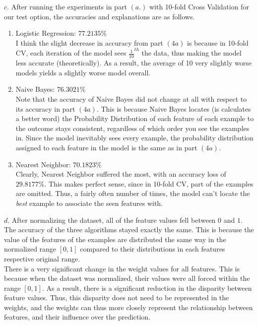 \documentclass[11pt]{article}
\begin{document}
\noindent $c.$ After running the experiments in part $(a.)$ with 10-fold Cross Validation for our test option, the accuracies and explanations are as follows.
\begin{enumerate}
\item Logistic Regression: $77.2135\%$\\
I think the slight decrease in accuracy from part $(4a)$ is because in 10-fold CV, each iteration of the model sees $\frac{1}{10}^{th}$ the data, thus making the model less accurate (theoretically). As a result, the average of 10 very slightly worse models yields a slightly worse model overall. 
\item Naive Bayes: $76.3021\%$\\
Note that the accuracy of Naive Bayes did not change at all with respect to its accuracy in part $(4a)$. This is because Naive Bayes locates (is calculates a better word) the Probability Distribution of each feature of each example to the outcome stays consistent, regardless of which order you see the examples in. Since the model inevitably sees every example, the probability distribution assigned to each feature in the model is the same as in part $(4a)$.
\item Nearest Neighbor: $70.1823\%$\\
Clearly, Nearest Neighbor suffered the most, with an accuracy loss of $29.8177\%$. This makes perfect sense, since in 10-fold CV, part of the examples are omitted. Thus, a fairly often number of times, the model can't locate the \textit{best} example to associate the seen features with. 
\end{enumerate}

\noindent $d.$ After normalizing the dataset, all of the feature values fell between $0$ and $1$.\\

The accuracy of the three algorithms stayed exactly the same. This is because the value of the features of the examples are distributed the same way in the normalized range $[0, 1]$ compared to their distributions in each features respective original range.\\

There is a very significant change in the weight values for all features. This is because when the dataset was normalized, their values were all forced within the range $[0, 1]$. As a result, there is a significant reduction in the disparity between feature values. Thus, this disparity does not need to be represented in the weights, and the weights can thus more closely represent the relationship between features, and their influence over the prediction.\\
\pagebreak
\end{document}
